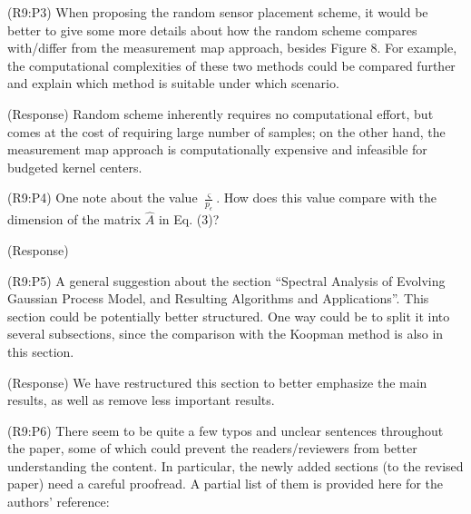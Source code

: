 \documentclass{letter}
\begin{document}
{\color{red}(R9:P3)} When proposing the random sensor placement scheme, it would be better to give some more details about how the random scheme compares with/differ from the measurement map approach, besides Figure 8. For example, the computational complexities of these two methods could be compared further and explain which method is suitable under which scenario.

{\color{red}(Response)}  Random scheme inherently requires no computational effort, but comes at the cost of requiring large number of samples; on the other hand, the measurement map approach is computationally expensive and infeasible for budgeted kernel centers. 

{\color{red}(R9:P4)} One note about the value $\frac{\varsigma}{p_{\epsilon}}$. How does this value compare with the dimension of the matrix $\hat{A}$ in Eq. (3)?

{\color{red}(Response)} 

{\color{red}(R9:P5)} A general suggestion about the section “Spectral Analysis of Evolving Gaussian Process Model, and Resulting Algorithms and Applications”. This section could be potentially better structured. One way could be to split it into several subsections, since the comparison with the Koopman method is also in this section.

{\color{red}(Response)} We have restructured this section to better emphasize the main results, as well as remove less important results.

{\color{red}(R9:P6)} There seem to be quite a few typos and unclear sentences throughout the paper, some of which could prevent the readers/reviewers from better
understanding the content. In particular, the newly added sections (to the revised paper) need a careful proofread. A partial list of them is
provided here for the authors’ reference: 
\end{document}
